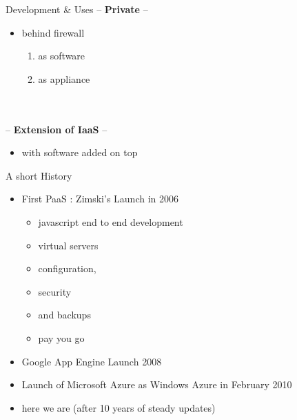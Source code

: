 \documentclass{beamer}
\begin{document}
\begin{frame}{Development \& Uses}
	 \centering
	--\textbf{ Private} --  
	\
	\begin{itemize}
		\centering
	\item behind firewall
	\begin{enumerate}[label= \Alph*]
		\centering
		\item as software
		\item as appliance
	\end{enumerate}

	\end{itemize}
\ \\ \ \\    \centering
--\textbf{ Extension of IaaS } --
\begin{itemize}
	\centering
   \item with software added on top
\end{itemize}
	
\end{frame}
\begin{frame}{A short History}
	\begin{itemize}
	\item First PaaS : Zimski's Launch in 2006
	\begin{itemize}
	\item javascript end to end development 
	\item virtual servers 
	\item  configuration,
	\item  security
	\item and backups
	\item pay you go
	\end{itemize}
	

	\item Google App Engine Launch 2008
		\item Launch of  Microsoft Azure as Windows Azure in February 2010
	\item here we are (after 10 years of steady updates)
	\end{itemize}
\end{frame}
\end{document}

